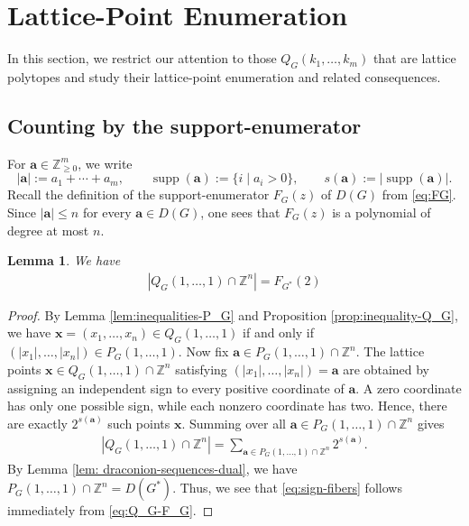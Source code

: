\documentclass[11pt,a4paper]{article}
\newcommand{\vct}[1]{\boldsymbol{#1}}
\newcommand{\Z}{\mathbb{Z}}
\newcommand{\supp}{\operatorname{supp}}
\newcommand{\1}{\mathbf{1}}
\theoremstyle{plain}
\newtheorem{lemma}[theorem]{Lemma}
\theoremstyle{definition}
\begin{document}
\section{Lattice-Point Enumeration}\label{sec:lttice-point-enumeration}

In this section, we restrict our attention to those $Q_G(k_1,\ldots,k_m)$ that are lattice polytopes and study their lattice-point enumeration and related consequences.

\subsection{Counting by the support-enumerator}

For $\vct{a}\in\Z_{\ge0}^m$, we write
\[
|\vct{a}|:=a_1+\cdots+a_m,\qquad
\supp(\vct{a}):=\{i\mid a_i>0\},\qquad
s(\vct{a}):=|\supp(\vct{a})|.
\]
Recall the definition of the support-enumerator $F_G(z)$ of $D(G)$ from \eqref{eq:FG}. Since $|\vct{a}|\le n$ for every $\vct{a}\in D(G)$, one sees that $F_G(z)$ is a polynomial of degree at most $n$.

\begin{lemma}\label{lem:Q_G-F_G}
We have
\begin{align}
\label{eq:sign-fibers}    |Q_G(1, \dots, 1)\cap\Z^n|
= F_{G^*}(2)
\end{align}
\end{lemma}
\begin{proof}
By Lemma \ref{lem:inequalities-P_G} and Proposition \ref{prop:inequality-Q_G}, we have $\vct{x} = (x_1, \dots, x_n) \in Q_G(1, \dots, 1)$ if and only if $(|x_1|, \dots, |x_n|) \in P_G(1, \dots, 1)$. Now fix $\vct{a}\in P_G(1, \dots, 1)\cap\Z^n$. The lattice points $\vct{x}\in Q_G(1,\dots,1)\cap\Z^n$ satisfying $(|x_1|, \dots, |x_n|)=\vct{a}$ are obtained by assigning an independent sign to every positive coordinate of $\vct{a}$. A zero coordinate has only one possible sign, while each nonzero coordinate has two. Hence, there are exactly $2^{s(\vct{a})}$ such points $\vct{x}$. Summing over all $\vct{a}\in P_G(1,\dots, 1)\cap\Z^n$ gives
\begin{align}\label{eq:Q_G-F_G}
    |Q_G(1, \dots, 1)\cap\Z^n|
=\sum_{\vct{a}\in P_G(1, \dots, 1)\cap\Z^n}2^{s(\vct{a})}. 
\end{align}
By Lemma \ref{lem: draconion-sequences-dual}, we have $P_G(1,\dots, 1)\cap\Z^n = D(G^*).$ Thus, we see that \eqref{eq:sign-fibers} follows immediately from \eqref{eq:Q_G-F_G}.
\end{proof}
\end{document}
